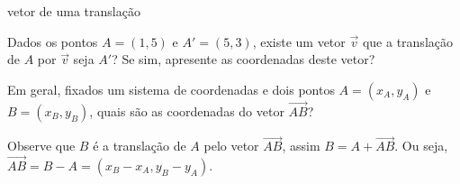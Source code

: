 \begin{task}{ vetor de uma translação}
\label{ativ-vetores-coord-extremidades}

Dados os pontos \(A = (1, 5)\) e \(A' = (5, 3)\), existe um vetor  \(\vec{v}\) que a translação de \(A\) por \(\vec{v}\) seja \(A'\)? Se sim, apresente as coordenadas deste vetor?
\end{task}



Em geral, fixados um sistema de coordenadas e dois pontos \(A=(x_A,y_A)\) e \(B=(x_B,y_B)\), quais são as coordenadas do vetor \(\overrightarrow{AB}\)?

Observe que \(B\) é a translação de \(A\) pelo vetor \(\overrightarrow{AB}\), assim \(B=A + \overrightarrow{AB}\). Ou seja, \(\overrightarrow{AB} = B-A = (x_B - x_A, y_B - y_A)\).
\begin{center}
\end{center}\label{\detokenize{GE101-1A:ativ-vetores-alg-vetores-iguais}}





